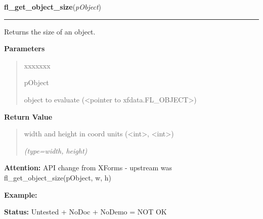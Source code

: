 \hspace{.8\funcindent}\begin{boxedminipage}{\funcwidth}

    \raggedright \textbf{fl\_get\_object\_size}(\textit{pObject})

    \vspace{-1.5ex}

    \rule{\textwidth}{0.5\fboxrule}
\setlength{\parskip}{2ex}
    Returns the size of an object.

\setlength{\parskip}{1ex}
      \textbf{Parameters}
      \vspace{-1ex}

      \begin{quote}
        \begin{Ventry}{xxxxxxx}

          \item[pObject]

          object to evaluate ({\textless}pointer to 
          xfdata.FL\_OBJECT{\textgreater})

        \end{Ventry}

      \end{quote}

      \textbf{Return Value}
    \vspace{-1ex}

      \begin{quote}
      width and height in coord units ({\textless}int{\textgreater}, 
      {\textless}int{\textgreater})

      {\it (type=width, height)}

      \end{quote}

\textbf{Attention:} API change from XForms - upstream was fl\_get\_object\_size(pObject, w, h)



\textbf{Example:} 

\textbf{Status:} Untested + NoDoc + NoDemo = NOT OK



    \end{boxedminipage}

    \label{xformslib:library:fl_set_object_size}

    \vspace{0.5ex}

